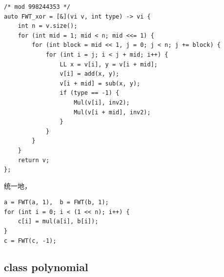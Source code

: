 \documentclass[UTF8, a4paper, titlepage, twoside]{ctexart}
\begin{document}
\begin{lstlisting}[style=cpp]
/* mod 998244353 */
auto FWT_xor = [&](vi v, int type) -> vi {
    int n = v.size();
    for (int mid = 1; mid < n; mid <<= 1) {
        for (int block = mid << 1, j = 0; j < n; j += block) {
            for (int i = j; i < j + mid; i++) {
                LL x = v[i], y = v[i + mid];
                v[i] = add(x, y);
                v[i + mid] = sub(x, y);
                if (type == -1) {
                    Mul(v[i], inv2);
                    Mul(v[i + mid], inv2);
                }
            }
        }
    }
    return v;
};
\end{lstlisting}

统一地，
\begin{lstlisting}[style=cpp]
a = FWT(a, 1),  b = FWT(b, 1);
for (int i = 0; i < (1 << n); i++) {
    c[i] = mul(a[i], b[i]);
}
c = FWT(c, -1);
\end{lstlisting}

\subsection{ class polynomial }
\end{document}
